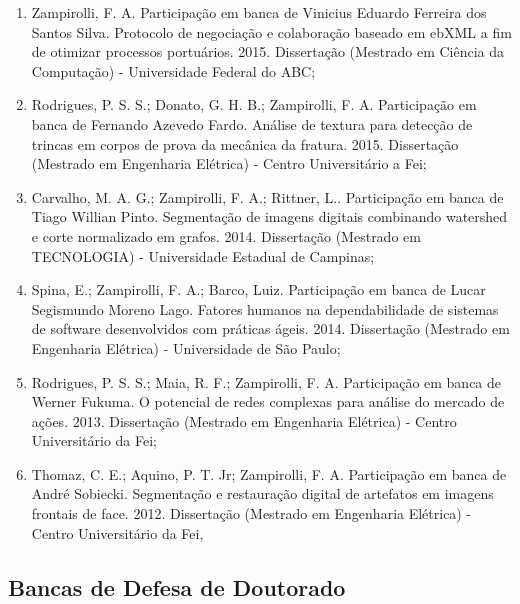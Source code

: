 \begin{enumerate}
    \item Zampirolli, F. A. Participação em banca de Vinicius Eduardo Ferreira dos Santos Silva. Protocolo de negociação e colaboração baseado em ebXML a fim de otimizar processos portuários. 2015. Dissertação (Mestrado em Ciência da Computação) - Universidade Federal do ABC;
    \item Rodrigues, P. S. S.; Donato, G. H. B.; Zampirolli, F. A. Participação em banca de Fernando Azevedo Fardo. Análise de textura para detecção de trincas em corpos de prova da mecânica da fratura. 2015. Dissertação (Mestrado em Engenharia Elétrica) - Centro Universitário a Fei;
    \item Carvalho, M. A. G.; Zampirolli, F. A.; Rittner, L.. Participação em banca de Tiago Willian Pinto. Segmentação de imagens digitais combinando watershed e corte normalizado em grafos. 2014. Dissertação (Mestrado em TECNOLOGIA) - Universidade Estadual de Campinas;
    \item Spina, E.; Zampirolli, F. A.; Barco, Luiz. Participação em banca de Lucar Segismundo Moreno Lago. Fatores humanos na dependabilidade de sistemas de software desenvolvidos com práticas ágeis. 2014. Dissertação (Mestrado em Engenharia Elétrica) - Universidade de São Paulo;
    \item Rodrigues, P. S. S.; Maia, R. F.; Zampirolli, F. A. Participação em banca de Werner Fukuma. O potencial de redes complexas para análise do mercado de ações. 2013. Dissertação (Mestrado em Engenharia Elétrica) - Centro Universitário da Fei;
    \item Thomaz, C. E.; Aquino, P. T. Jr; Zampirolli, F. A. Participação em banca de André Sobiecki. Segmentação e restauração digital de artefatos em imagens frontais de face. 2012. Dissertação (Mestrado em Engenharia Elétrica) - Centro Universitário da Fei,
\end{enumerate}


\subsection{Bancas de Defesa de Doutorado}

